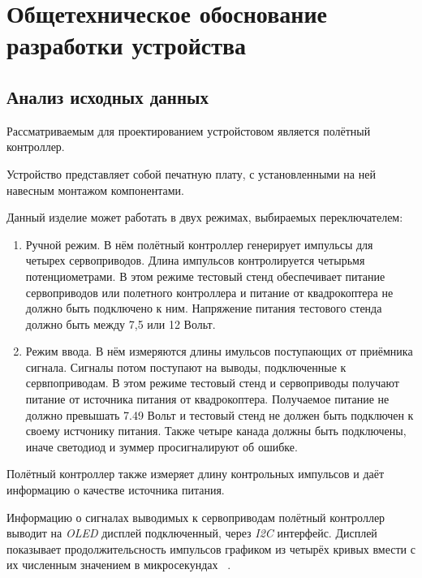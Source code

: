 \section{Общетехническое обоснование \\
  разработки устройства}


\subsection{Анализ исходных данных}

Рассматриваемым для проектированием устройстовом является полётный
контроллер.

Устройство представляет собой печатную плату, с установленными на ней
навесным монтажом компонентами.


Данный изделие может работать в двух режимах, выбираемых
переключателем:

\begin{enumerate} 
  
\item Ручной режим. В нём полётный контроллер генерирует импульсы для
четырех сервоприводов. Длина импульсов контролируется четырьмя
потенциометрами. В этом режиме тестовый стенд обеспечивает питание
сервоприводов или полетного контроллера и питание от квадрокоптера не
должно быть подключено к ним. Напряжение питания тестового стенда
должно быть между 7,5 или 12 Вольт.
  
\item Режим ввода. В нём измеряются длины имульсов поступающих от
приёмника сигнала. Сигналы потом поступают на выводы, подключенные к
сервпоприводам.  В этом режиме тестовый стенд и сервоприводы получают
питание от источника питания от квадрокоптера. Получаемое питание не
должно превышать 7.49 Вольт и тестовый стенд не должен быть подключен
к своему истчонику питания. Также четыре канада должны быть
подключены, иначе светодиод и зуммер просигналируют об ошибке.

\end{enumerate}

Полётный контроллер также измеряет длину контрольных импульсов и даёт
информацию о качестве источника питания.

Информацию о сигналах выводимых к сервоприводам полётный контроллер
выводит на \textit{OLED} дисплей подключенный, через \textit{I2C}
интерфейс.  Дисплей показывает продолжительсность импульсов графиком
из четырёх кривых вмести с их численным значением в микросекундах
~\cite{Elector521}.

